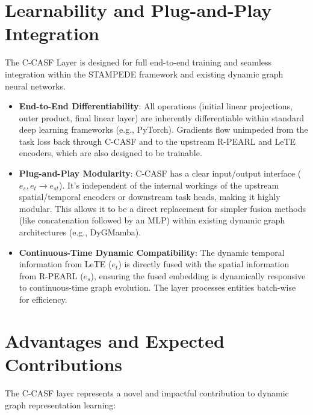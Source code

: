 \documentclass[11pt]{article}
\begin{document}
\begin{itemize}
\section{Learnability and Plug-and-Play Integration}

The C-CASF Layer is designed for full end-to-end training and seamless integration within the STAMPEDE framework and existing dynamic graph neural networks.

\begin{itemize}
    \item \textbf{End-to-End Differentiability}: All operations (initial linear projections, outer product, final linear layer) are inherently differentiable within standard deep learning frameworks (e.g., PyTorch). Gradients flow unimpeded from the task loss back through C-CASF and to the upstream R-PEARL and LeTE encoders, which are also designed to be trainable.
    \item \textbf{Plug-and-Play Modularity}: C-CASF has a clear input/output interface ($e_s, e_t \rightarrow e_{st}$). It's independent of the internal workings of the upstream spatial/temporal encoders or downstream task heads, making it highly modular. This allows it to be a direct replacement for simpler fusion methods (like concatenation followed by an MLP) within existing dynamic graph architectures (e.g., DyGMamba).
    \item \textbf{Continuous-Time Dynamic Compatibility}: The dynamic temporal information from LeTE ($e_t$) is directly fused with the spatial information from R-PEARL ($e_s$), ensuring the fused embedding is dynamically responsive to continuous-time graph evolution. The layer processes entities batch-wise for efficiency.
\end{itemize}

\section{Advantages and Expected Contributions}

The C-CASF layer represents a novel and impactful contribution to dynamic graph representation learning:


\end{itemize}
\end{document}
